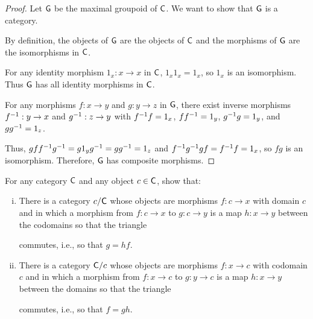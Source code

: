 \begin{proof}
	Let $\mathsf{G}$ be the maximal groupoid of $\mathsf{C}$. We want to show that $\mathsf{G}$ is a category.

	By definition, the objects of $\mathsf{G}$ are the objects of $\mathsf{C}$ and the morphisms of $\mathsf{G}$ are the isomorphisms in $\mathsf{C}$.

	For any identity morphism $1_x:x \rightarrow x$ in $\mathsf{C}$, $1_x1_x = 1_x$, so $1_x$ is an isomorphism.
	Thus $\mathsf{G}$ has all identity morphisms in $\mathsf{C}$.

	For any morphisms $f:x \rightarrow y$ and $g:y \rightarrow z$ in $\mathsf{G}$, there exist inverse morphisms $f^{-1} : y \rightarrow x$ and $g^{-1} : z \rightarrow y$ with $f^{-1} f = 1_x$, $ff^{-1} = 1_y$, $g^{-1} g = 1_y$, and $gg^{-1} = 1_z$.

	Thus, $g f f^{-1} g^{-1} = g 1_y g^{-1} = gg^{-1} = 1_z$ and $f^{-1} g^{-1} g f = f^{-1} f = 1_x$, so $fg$ is an isomorphism.
	Therefore, $\mathsf{G}$ has composite morphisms.
\end{proof}

\begin{problem}
	For any category $\mathsf{C}$ and any object $c \in \mathsf{C}$, show that:

	\begin{enumerate}[(i)]
		\item There is a category $c/\mathsf{C}$ whose objects are morphisms $f:c \rightarrow x$ with domain $c$
			and in which a morphism from $f:c \rightarrow x$ to $g:c \rightarrow y$ is a map $h:x \rightarrow y$ between the codomains
			so that the triangle


			commutes, i.e., so that $g = hf$.

		\item There is a category $\mathsf{C}/c$ whose objects are morphisms $f:x \rightarrow c$ with codomain $c$
			and in which a morphism from $f:x \rightarrow c$ to $g:y \rightarrow c$ is a map $h:x \rightarrow y$ between the domains
			so that the triangle


			commutes, i.e., so that $f = gh$.
	\end{enumerate}
\end{problem}

